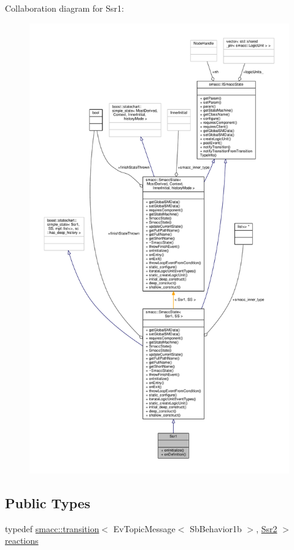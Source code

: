 Collaboration diagram for Ssr1\+:
\nopagebreak
\begin{figure}[H]
\begin{center}
\leavevmode
\includegraphics[height=550pt]{structSsr1__coll__graph}
\end{center}
\end{figure}
\subsection*{Public Types}
\begin{DoxyCompactItemize}
\item 
typedef \hyperlink{classsmacc_1_1transition}{smacc\+::transition}$<$ Ev\+Topic\+Message$<$ Sb\+Behavior1b $>$, \hyperlink{structSsr2}{Ssr2} $>$ \hyperlink{structSsr1_a3235ebe7e1d5b4d482fb531680f1c395}{reactions}
\end{DoxyCompactItemize}
